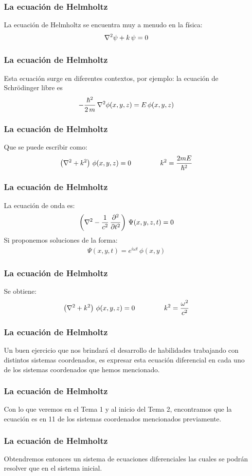 \documentclass[12pt]{beamer}
\begin{document}
\begin{frame}
\frametitle{La ecuación de Helmholtz}
La ecuación de Helmholtz se encuentra muy a menudo en la física:
\pause
\begin{align*}
\laplacian{\psi} + k \, \psi = 0
\end{align*}
\end{frame}
\begin{frame}
\frametitle{La ecuación de Helmholtz}
Esta ecuación surge en diferentes contextos, \pause por ejemplo: \pause la ecuación de Schrödinger libre es
\pause
\begin{align*}
- \dfrac{\hbar^{2}}{2 \, m} \, \laplacian{\phi} (x, y, z) = E \, \phi (x, y, z)
\end{align*}
\end{frame}
\begin{frame}
\frametitle{La ecuación de Helmholtz}
Que se puede escribir como:
\begin{align*}
\left( \laplacian + k^{2} \right) \, \phi (x, y, z) = 0 \hspace{1.5cm} k^{2} = \dfrac{2 m E}{\hbar^{2}}
\end{align*}
\end{frame}
\begin{frame}
\frametitle{La ecuación de Helmholtz}
La ecuación de onda es:
\begin{align*}
\left( \laplacian - \dfrac{1}{c^{2}} \, \pdv[2]{t} \right) \, \Psi (x, y, z, t) = 0
\end{align*}
\pause
Si proponemos soluciones de la forma:
\begin{align*}
\Psi (x, y, t) = e^{i \omega t} \, \phi (x, y)
\end{align*}
\end{frame}
\begin{frame}
\frametitle{La ecuación de Helmholtz}
Se obtiene:
\pause
\begin{align*}
\left( \laplacian + k^{2} \right) \, \phi (x, y, z) = 0 \hspace{1.5cm} k^{2} = \dfrac{\omega^{2}}{c^{2}}
\end{align*}
\end{frame}
\begin{frame}
\frametitle{La ecuación de Helmholtz}
Un buen ejercicio que nos brindará el desarrollo de habilidades trabajando con distintos sistemas coordenados, es expresar esta ecuación diferencial en cada uno de los sistemas coordenados que hemos mencionado.
\end{frame}
\begin{frame}
\frametitle{La ecuación de Helmholtz}
Con lo que veremos en el Tema 1 y al inicio del Tema 2, encontramos que la ecuación es  en 11 de los sistemas coordenados mencionados previamente.
\end{frame}
\begin{frame}
\frametitle{La ecuación de Helmholtz}
Obtendremos entonces un sistema de ecuaciones diferenciales las cuales se podrán resolver  que en el sistema inicial.
\end{frame}
\end{document}
